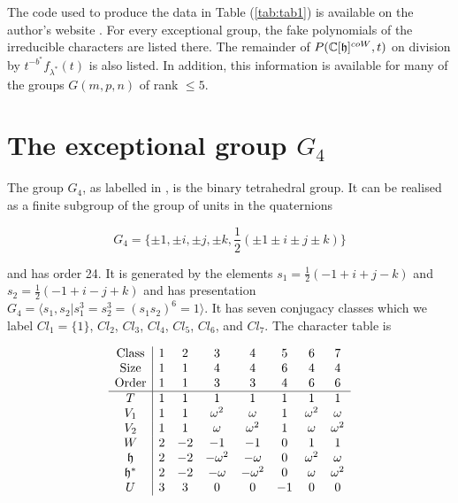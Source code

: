 \documentclass[a4apper,10pt]{amsart}
\theoremstyle{definition}
\numberwithin{thm}{section}
\newcommand{\C}{\mathbb{C}}
\begin{document}
\noindent The code used to produce the data in Table (\ref{tab:tab1}) is available on the author's website \cite{10}. For every exceptional group, the fake polynomials of the irreducible characters are listed there. The remainder of $P(\C[\frak{h}]^{coW},t)$ on division by $t^{-b^*}f_{\lambda^*}(t)$ is also listed. In addition, this information is available for many of the groups $G(m,p,n)$ of rank $\le 5$. 

\section{The exceptional group $G_4$}

\noindent The group $G_4$, as labelled in \cite{5}, is the binary tetrahedral
group. It can be realised as a finite subgroup of the group of units in the quaternions

\begin{displaymath}
G_4 = \{ \pm 1,\pm i, \pm j , \pm k, \frac{1}{2}(\pm 1 \pm i \pm j
\pm k) \}
\end{displaymath}

\noindent and has order 24. It is generated by the elements $s_1 =
\frac{1}{2}(-1 + i + j - k)$ and $s_2 =  \frac{1}{2}(-1 + i - j + k)$
and has presentation $G_4 = \langle s_1,s_2 | s_1^3 = s_2^3 =
(s_1s_2)^6 = 1 \rangle$. It has seven conjugacy classes which we label $Cl_1 = \{
1 \}$, $Cl_2$, $Cl_3$, $Cl_4$, $Cl_5$, $Cl_6$, and $Cl_7$. The
character table is

\begin{displaymath}
\begin{array}{c|ccccccc}
\textrm{Class} & 1 & 2 & 3 & 4 & 5 & 6 & 7\\
\textrm{Size} & 1 & 1 & 4 & 4 & 6 & 4 & 4\\
\textrm{Order} & 1 & 1 & 3 & 3 & 4 & 6 & 6\\
\hline
T   & 1 & 1 & 1 & 1 & 1 & 1 & 1 \\
V_1 & 1 & 1 & \omega^2 & \omega & 1 & \omega^2 & \omega \\
V_2 & 1 & 1 & \omega & \omega^2 & 1 & \omega & \omega^2 \\
W  & 2 & -2 & -1 & -1 & 0 & 1 & 1\\
\frak{h} & 2 & -2 & -\omega^2 & -\omega & 0 & \omega^2 & \omega \\
\frak{h}^* & 2 & -2 & -\omega & -\omega^2 & 0 & \omega & \omega^2 \\ 
U & 3 & 3 & 0 & 0 & -1 & 0 & 0
\end{array}
\end{displaymath}
\end{document}
